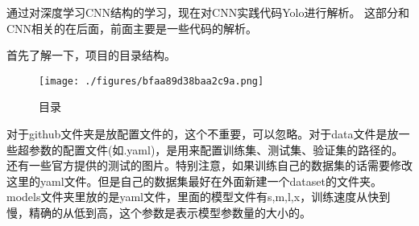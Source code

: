 

通过对深度学习CNN结构的学习，现在对CNN实践代码Yolo进行解析。
这部分和CNN相关的在后面，前面主要是一些代码的解析。

首先了解一下，项目的目录结构。\begin{figure}[ht]
\centering
\texttt{[image: ./figures/bfaa89d38baa2c9a.png]}
\caption{目录} \label{fig_yolov5_1}
\end{figure}
对于github文件夹是放配置文件的，这个不重要，可以忽略。对于data文件是放一些超参数的配置文件(如.yaml)，是用来配置训练集、测试集、验证集的路径的。还有一些官方提供的测试的图片。特别注意，如果训练自己的数据集的话需要修改这里的yaml文件。但是自己的数据集最好在外面新建一个dataset的文件夹。models文件夹里放的是yaml文件，里面的模型文件有s,m,l,x，训练速度从快到慢，精确的从低到高，这个参数是表示模型参数量的大小的。
